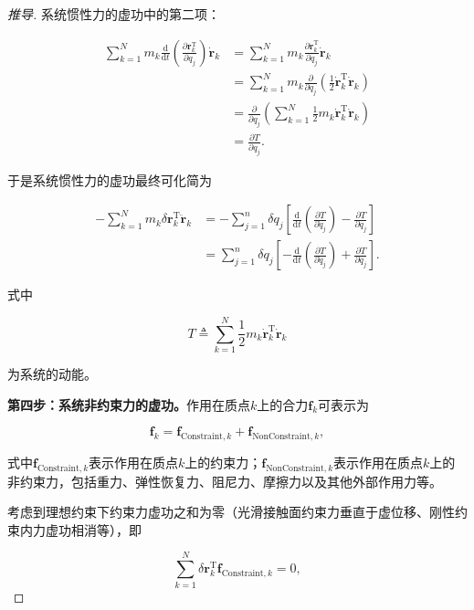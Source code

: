 \begin{proof}[推导]
系统惯性力的虚功中的第二项：

\[
\begin{aligned}
\sum_{k=1}^{N} m_k \frac{\mathrm{d}}{\mathrm{d}t}\left(\frac{\partial \boldsymbol{r}_k^{\mathrm{T}}}{\partial q_j}\right)\dot{\boldsymbol{r}}_k
&= \sum_{k=1}^{N} m_k \frac{\partial \dot{\boldsymbol{r}}_k^{\mathrm{T}}}{\partial q_j}\dot{\boldsymbol{r}}_k \\
&= \sum_{k=1}^{N} m_k \frac{\partial}{\partial q_j}\left(\frac{1}{2}\dot{\boldsymbol{r}}_k^{\mathrm{T}}\dot{\boldsymbol{r}}_k\right) \\
&= \frac{\partial}{\partial q_j}\left(\sum_{k=1}^{N}\frac{1}{2}m_k\dot{\boldsymbol{r}}_k^{\mathrm{T}}\dot{\boldsymbol{r}}_k\right) \\
&= \frac{\partial T}{\partial q_j}.
\end{aligned}
\]

于是系统惯性力的虚功最终可化简为

\[
\begin{aligned}
-\sum_{k=1}^{N} m_k \delta\boldsymbol{r}_k^{\mathrm{T}}\ddot{\boldsymbol{r}}_k
&= -\sum_{j=1}^{n}\delta q_j\left[\frac{\mathrm{d}}{\mathrm{d}t}\left(\frac{\partial T}{\partial \dot{q}_j}\right) - \frac{\partial T}{\partial q_j}\right] \\
&= \sum_{j=1}^{n}\delta q_j\left[-\frac{\mathrm{d}}{\mathrm{d}t}\left(\frac{\partial T}{\partial \dot{q}_j}\right) + \frac{\partial T}{\partial q_j}\right].
\end{aligned}
\]

式中

\[
T \triangleq \sum_{k=1}^{N}\frac{1}{2}m_k\dot{\boldsymbol{r}}_k^{\mathrm{T}}\dot{\boldsymbol{r}}_k
\]

为系统的动能。

\textbf{第四步：系统非约束力的虚功。}作用在质点$k$上的合力$\boldsymbol{f}_k$可表示为

\[
\boldsymbol{f}_k = \boldsymbol{f}_{\text{Constraint},k} + \boldsymbol{f}_{\text{NonConstraint},k},
\]

式中$\boldsymbol{f}_{\text{Constraint},k}$表示作用在质点$k$上的约束力；$\boldsymbol{f}_{\text{NonConstraint},k}$表示作用在质点$k$上的非约束力，包括重力、弹性恢复力、阻尼力、摩擦力以及其他外部作用力等。

考虑到理想约束下约束力虚功之和为零（光滑接触面约束力垂直于虚位移、刚性约束内力虚功相消等），即

\[
\sum_{k=1}^{N}\delta\boldsymbol{r}_k^{\mathrm{T}}\boldsymbol{f}_{\text{Constraint},k} = 0,
\]


\end{proof}
